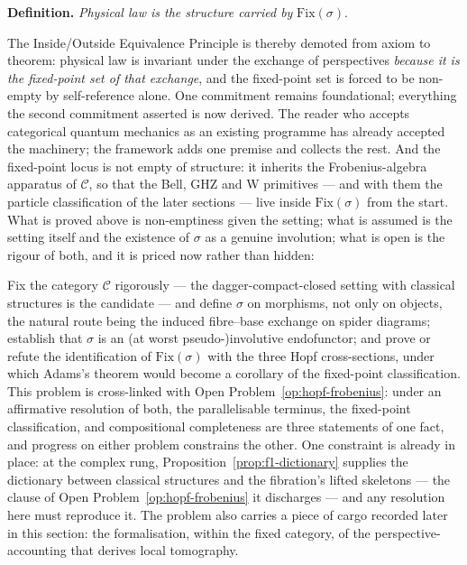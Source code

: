 \textbf{Definition.} \emph{Physical law is the structure carried by} $\mathrm{Fix}(\sigma)$.

The Inside/Outside Equivalence Principle is thereby demoted from axiom to theorem: physical law is
invariant under the exchange of perspectives \emph{because it is the fixed-point set of that
exchange}, and the fixed-point set is forced to be non-empty by self-reference alone. One
commitment remains foundational; everything the second commitment asserted is now derived. The
reader who accepts categorical quantum mechanics as an existing programme has already accepted the
machinery; the framework adds one premise and collects the rest. And the fixed-point locus is not
empty of structure: it inherits the Frobenius-algebra apparatus of $\mathcal{C}$, so that the
Bell, GHZ and W primitives --- and with them the particle classification of the later sections ---
live inside $\mathrm{Fix}(\sigma)$ from the start. What is proved above is non-emptiness given the
setting; what is assumed is the setting itself and the existence of $\sigma$ as a genuine
involution; what is open is the rigour of both, and it is priced now rather than hidden:

\begin{openproblem}\label{op:sigma-functor}
Fix the category $\mathcal{C}$ rigorously --- the dagger-compact-closed setting with classical
structures is the candidate --- and define $\sigma$ on morphisms, not only on objects, the natural
route being the induced fibre--base exchange on spider diagrams; establish that $\sigma$ is an (at
worst pseudo-)involutive endofunctor; and prove or refute the identification of
$\mathrm{Fix}(\sigma)$ with the three Hopf cross-sections, under which Adams's theorem would become
a corollary of the fixed-point classification. This problem is cross-linked with Open
Problem~\ref{op:hopf-frobenius}: under an affirmative resolution of both, the parallelisable
terminus, the fixed-point classification, and compositional completeness are three statements of
one fact, and progress on either problem constrains the other. One constraint is already in place:
at the complex rung, Proposition~\ref{prop:f1-dictionary} supplies the dictionary between
classical structures and the fibration's lifted skeletons --- the clause of
Open Problem~\ref{op:hopf-frobenius} it discharges --- and any resolution here must reproduce it.
The problem also carries a piece of cargo recorded later in this section: the formalisation, within
the fixed category, of the perspective-accounting that derives local tomography.
\end{openproblem}

